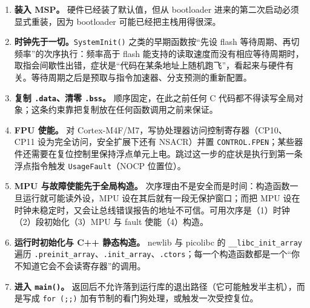 \documentclass[12pt,a4paper,fontset=fandol]{ctexbook}
\newcommand{\Fn}[1]{\texttt{#1()}}
\newcommand{\Tp}[1]{\texttt{#1}}
\begin{document}
\begin{enumerate}
  \item \textbf{装入 MSP。} 硬件已经装了默认值，但从 bootloader 进来的第二次启动必须显式重装，因为 bootloader 可能已经把主栈用得很深。
  \item \textbf{时钟先于一切。}\Fn{SystemInit} 之类的早期函数按``先设 flash 等待周期、再切频率''的次序执行：频率高于 flash 能支持的读取速度而没有相应等待周期时，取指会间歇性出错，症状是``代码在某条地址上随机跑飞''，看起来与硬件有关。等待周期之后是预取与指令加速器、分支预测的重新配置。
  \item \textbf{复制 \Tp{.data}、清零 \Tp{.bss}。} 顺序固定，在此之前任何 C 代码都不得读写全局对象；这条约束靠把复制放在任何函数调用之前来保证。
  \item \textbf{FPU 使能。} 对 Cortex-M4F/M7，写协处理器访问控制寄存器（CP10、CP11 设为完全访问，安全扩展下还有 NSACR）并置 \Tp{CONTROL.FPEN}；某些器件还需要在复位控制里保持浮点单元上电。跳过这一步的症状是执行到第一条浮点指令触发 \Tp{UsageFault}（NOCP 位置位）。
  \item \textbf{MPU 与故障使能先于全局构造。} 次序理由不是安全而是时间：构造函数一旦运行就可能读外设，MPU 设在其后就有一段无保护窗口；而把 MPU 设在时钟未稳定时，又会让总线错误报告的地址不可信。可用次序是（1）时钟（2）段初始化（3）MPU 与 fault 使能（4）构造。
  \item \textbf{运行时初始化与 C++ 静态构造。} newlib 与 picolibc 的 \Tp{\_\_libc\_init\_array} 遍历 \Tp{.preinit\_array}、\Tp{.init\_array}、\Tp{.ctors}；每一个构造函数都是一个``你不知道它会不会读寄存器''的调用。
  \item \textbf{进入 \Fn{main}。} 返回后不允许落到运行库的退出路径（它可能触发半主机），而是写成 \Tp{for (;;)} 加有节制的看门狗处理，或触发一次受控复位。
\end{enumerate}
\end{document}
